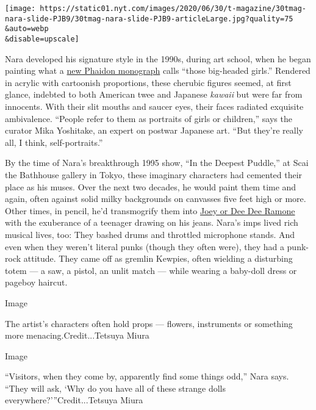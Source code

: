 \texttt{[image: https://static01.nyt.com/images/2020/06/30/t-magazine/30tmag-nara-slide-PJB9/30tmag-nara-slide-PJB9-articleLarge.jpg?quality=75\\\&auto=webp\\\&disable=upscale]}

Nara developed his signature style in the 1990s, during art school, when
he began painting what a
\href{https://www.phaidon.com/store/art/yoshitomo-nara-9780714879949/}{new
Phaidon monograph} calls ``those big-headed girls.'' Rendered in acrylic
with cartoonish proportions, these cherubic figures seemed, at first
glance, indebted to both American twee and Japanese \emph{kawaii} but
were far from innocents. With their slit mouths and saucer eyes, their
faces radiated exquisite ambivalence. ``People refer to them as
portraits of girls or children,'' says the curator Mika Yoshitake, an
expert on postwar Japanese art. ``But they're really all, I think,
self-portraits.''

By the time of Nara's breakthrough 1995 show, ``In the Deepest Puddle,''
at Scai the Bathhouse gallery in Tokyo, these imaginary characters had
cemented their place as his muses. Over the next two decades, he would
paint them time and again, often against solid milky backgrounds on
canvasses five feet high or more. Other times, in pencil, he'd
transmogrify them into
\href{https://www.nytimes.com/2016/04/15/arts/music/his-brothers-keeper-a-ramones-tour-of-queens.html}{Joey
or Dee Dee Ramone} with the exuberance of a teenager drawing on his
jeans. Nara's imps lived rich musical lives, too: They bashed drums and
throttled microphone stands. And even when they weren't literal punks
(though they often were), they had a punk-rock attitude. They came off
as gremlin Kewpies, often wielding a disturbing totem --- a saw, a
pistol, an unlit match --- while wearing a baby-doll dress or pageboy
haircut.

Image

The artist's characters often hold props --- flowers, instruments or
something more menacing.Credit...Tetsuya Miura

Image

``Visitors, when they come by, apparently find some things odd,'' Nara
says. ``They will ask, `Why do you have all of these strange dolls
everywhere?'''Credit...Tetsuya Miura

